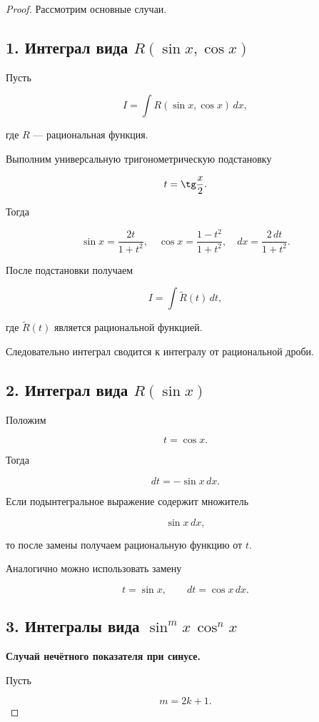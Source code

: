 \documentclass[14pt]{extreport}
\begin{document}
\begin{proof}

Рассмотрим основные случаи.

\subsection*{1. Интеграл вида $R(\sin x,\cos x)$}

Пусть

\[
I=\int R(\sin x,\cos x)\,dx,
\]

где $R$ --- рациональная функция.

Выполним универсальную тригонометрическую подстановку

\[
t=\tg\frac{x}{2}.
\]

Тогда

\[
\sin x=\frac{2t}{1+t^2},\quad \cos x=\frac{1-t^2}{1+t^2}, \quad dx=\frac{2\,dt}{1+t^2}.
\]

После подстановки получаем

\[
I=
\int \widetilde R(t)\,dt,
\]

где $\widetilde R(t)$ является рациональной функцией.

Следовательно интеграл сводится к интегралу от рациональной дроби.

\subsection*{2. Интеграл вида $R(\sin x)$}

Положим

\[
t=\cos x.
\]

Тогда

\[
dt=-\sin x\,dx.
\]

Если подынтегральное выражение содержит множитель

\[
\sin x\,dx,
\]

то после замены получаем рациональную функцию от $t$.

Аналогично можно использовать замену

\[
t=\sin x,
\qquad
dt=\cos x\,dx.
\]

\subsection*{3. Интегралы вида $\sin^m x\,\cos^n x$}

\textbf{Случай нечётного показателя при синусе.}

Пусть

\[
m=2k+1.
\]


\end{proof}
\end{document}
